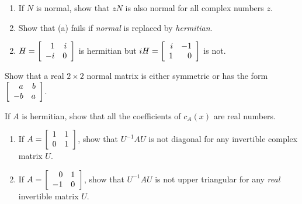 \begin{multicols}{2}
\begin{ex}
\begin{enumerate}[label={\alph*.}]
\end{enumerate}
\end{ex}

\begin{ex}
\begin{enumerate}[label={\alph*.}]
\item If $N$ is normal, show that $zN$ is also normal for all complex numbers $z$.

\item Show that (a) fails if \textit{normal} is replaced by \textit{hermitian}.

\end{enumerate}
\begin{sol}
\begin{enumerate}[label={\alph*.}]
\setcounter{enumi}{1}
\item  $H = \left[ \begin{array}{rr}
1 & i \\
-i & 0
\end{array}\right]$ is hermitian but $iH = \left[ \begin{array}{rr}
i & -1 \\
1 & 0
\end{array}\right]$ is not.

\end{enumerate}
\end{sol}
\end{ex}

\begin{ex}
Show that a real $2 \times 2$ normal matrix is either symmetric or has the form $\left[ \begin{array}{rr}
a & b \\
-b & a
\end{array}\right]$.
\end{ex}

\begin{ex}
If $A$ is hermitian, show that all the coefficients of $c_{A}(x)$ are real numbers.
\end{ex}

\begin{ex}
\begin{enumerate}[label={\alph*.}]
\item If $A = \left[ \begin{array}{rr}
1 & 1 \\
0 & 1
\end{array}\right]$, show that $U^{-1}AU$ is not diagonal for any invertible complex matrix $U$.

\item If $A = \left[ \begin{array}{rr}
0 & 1 \\
-1 & 0
\end{array}\right]$, show that $U^{-1}AU$ is not upper triangular for any \textit{real} invertible matrix $U$.


\end{enumerate}
\end{ex}
\end{multicols}
